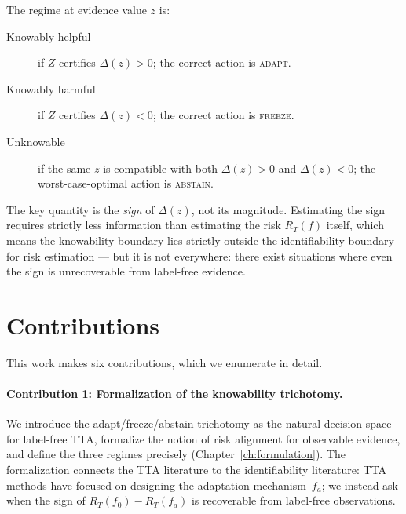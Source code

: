 The regime at evidence value $z$ is:
\begin{description}
\item[Knowably helpful] if $Z$ certifies $\Delta(z) > 0$; the correct
    action is \textsc{adapt}.
\item[Knowably harmful] if $Z$ certifies $\Delta(z) < 0$; the correct
    action is \textsc{freeze}.
\item[Unknowable] if the same $z$ is compatible with both $\Delta(z) > 0$
    and $\Delta(z) < 0$; the worst-case-optimal action is
    \textsc{abstain}.
\end{description}

The key quantity is the \emph{sign} of $\Delta(z)$, not its magnitude.
Estimating the sign requires strictly less information than estimating the
risk $R_T(f)$ itself, which means the knowability boundary lies strictly
outside the identifiability boundary for risk estimation --- but it is not
everywhere: there exist situations where even the sign is unrecoverable from
label-free evidence.

\section{Contributions}\label{sec:intro-contributions}

This work makes six contributions, which we enumerate in detail.

\paragraph{Contribution 1: Formalization of the knowability trichotomy.}
We introduce the adapt/freeze/abstain trichotomy as the natural decision
space for label-free TTA, formalize the notion of risk alignment for
observable evidence, and define the three regimes precisely
(Chapter~\ref{ch:formulation}).
The formalization connects the TTA literature to the identifiability
literature: TTA methods have focused on designing the adaptation
mechanism~$f_a$; we instead ask when the sign of $R_T(f_0) - R_T(f_a)$ is
recoverable from label-free observations.

